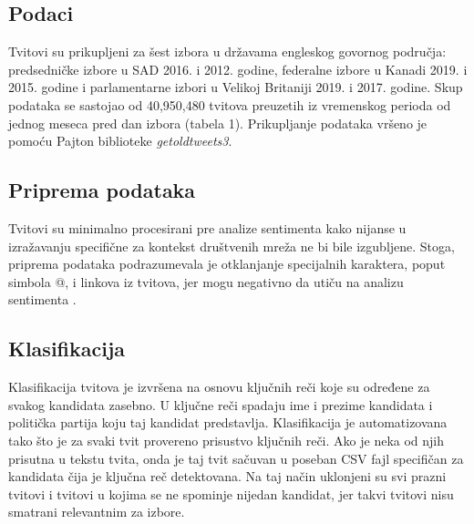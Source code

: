 \subsection{Podaci}

Tvitovi su prikupljeni za šest izbora u državama engleskog govornog područja: predsedničke izbore u SAD 2016. i 2012. godine, federalne izbore u Kanadi 2019. i 2015. godine i parlamentarne izbori u Velikoj Britaniji 2019. i 2017. godine. Skup podataka se sastojao od 40,950,480 tvitova preuzetih iz vremenskog perioda od jednog meseca pred dan izbora (tabela 1). Prikupljanje podataka vršeno je pomoću Pajton biblioteke \emph{getoldtweets3}.


\subsection{Priprema podataka}

Tvitovi su minimalno procesirani pre analize sentimenta kako nijanse u izražavanju specifične za kontekst društvenih mreža ne bi bile izgubljene. Stoga, priprema podataka podrazumevala je otklanjanje specijalnih karaktera, poput simbola @, i linkova iz tvitova, jer mogu negativno da utiču na analizu sentimenta \parencite{ramteke2016election}. 

\subsection{Klasifikacija}

Klasifikacija tvitova je izvršena na osnovu ključnih reči koje su određene za svakog kandidata zasebno. U ključne reči spadaju ime i prezime kandidata i politička partija koju taj kandidat predstavlja. Klasifikacija je automatizovana tako što je za svaki tvit provereno prisustvo ključnih reči. Ako je neka od njih prisutna u tekstu tvita, onda je taj tvit sačuvan u poseban CSV fajl specifičan za kandidata čija je ključna reč detektovana. Na taj način uklonjeni su svi prazni tvitovi i tvitovi u kojima se ne spominje nijedan kandidat, jer takvi tvitovi nisu smatrani relevantnim za izbore.

